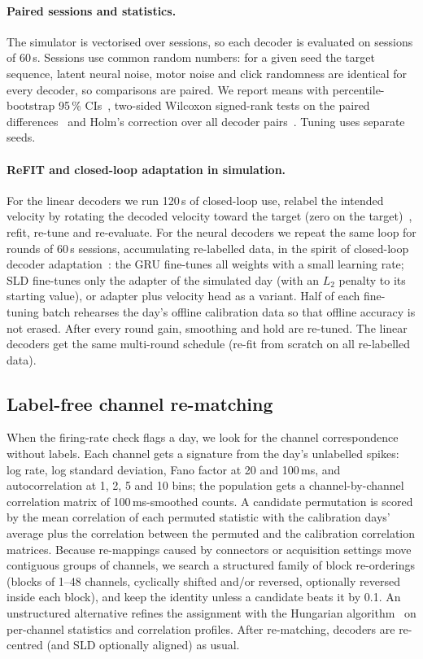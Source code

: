 \documentclass[10pt,twocolumn]{article}
\begin{document}
\paragraph{Paired sessions and statistics.} The simulator is vectorised over sessions, so each
decoder is evaluated on \nSimSessions{} sessions of 60\,s. Sessions use common random numbers:
for a given seed the target sequence, latent neural noise, motor noise and click randomness are
identical for every decoder, so comparisons are paired. We report means with percentile-bootstrap
95\,\% CIs~\cite{efron1993bootstrap}, two-sided Wilcoxon signed-rank tests on the paired
differences~\cite{wilcoxon1945} and Holm's correction over all decoder pairs~\cite{holm1979}.
Tuning uses separate seeds.

\paragraph{ReFIT and closed-loop adaptation in simulation.} For the linear decoders we run 120\,s
of closed-loop use, relabel the intended velocity by rotating the decoded velocity toward the
target (zero on the target)~\cite{gilja2012refit}, refit, re-tune and re-evaluate. For the
neural decoders we repeat the same loop for \cldaRounds{} rounds of \cldaSessions{} 60\,s
sessions, accumulating re-labelled data, in the spirit of closed-loop decoder
adaptation~\cite{dangi2013clda,orsborn2014clda}: the GRU fine-tunes all weights with a small
learning rate; SLD fine-tunes only the adapter of the simulated day (with an $L_2$ penalty to its
starting value), or adapter plus velocity head as a variant. Half of each fine-tuning batch
rehearses the day's offline calibration data so that offline accuracy is not erased. After every
round gain, smoothing and hold are re-tuned. The linear decoders get the same multi-round
schedule (re-fit from scratch on all re-labelled data).

\subsection{Label-free channel re-matching}
When the firing-rate check flags a day, we look for the channel correspondence without labels.
Each channel gets a signature from the day's unlabelled spikes: log rate, log standard
deviation, Fano factor at 20 and 100\,ms, and autocorrelation at 1, 2, 5 and 10 bins; the
population gets a channel-by-channel correlation matrix of 100\,ms-smoothed counts. A candidate
permutation is scored by the mean correlation of each permuted statistic with the calibration
days' average plus the correlation between the permuted and the calibration correlation matrices.
Because re-mappings caused by connectors or acquisition settings move contiguous groups of
channels, we search a structured family of \remapCands{} block re-orderings (blocks of 1--48
channels, cyclically shifted and/or reversed, optionally reversed inside each block), and keep the
identity unless a candidate beats it by 0.1. An unstructured alternative refines the assignment
with the Hungarian algorithm~\cite{kuhn1955hungarian} on per-channel statistics and correlation
profiles. After re-matching, decoders are re-centred (and SLD optionally aligned) as usual.
\end{document}
